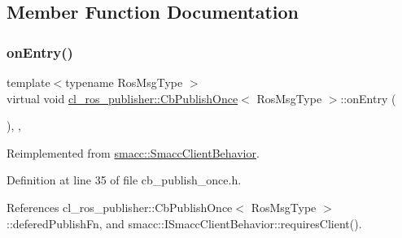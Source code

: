 \subsection{Member Function Documentation}
\mbox{\label{classcl__ros__publisher_1_1CbPublishOnce_afaed71bc2694ec1837278d5f931a76e1}} 
\subsubsection{\texorpdfstring{on\+Entry()}{onEntry()}}
{\footnotesize\ttfamily template$<$typename Ros\+Msg\+Type $>$ \\
virtual void \hyperlink{classcl__ros__publisher_1_1CbPublishOnce}{cl\+\_\+ros\+\_\+publisher\+::\+Cb\+Publish\+Once}$<$ Ros\+Msg\+Type $>$\+::on\+Entry (\begin{DoxyParamCaption}{ }\end{DoxyParamCaption})\hspace{0.3cm}{\ttfamily [inline]}, {\ttfamily [override]}, {\ttfamily [virtual]}}



Reimplemented from \hyperlink{classsmacc_1_1SmaccClientBehavior_ad5d3e1f1697c3cfe66c94cadba948493}{smacc\+::\+Smacc\+Client\+Behavior}.



Definition at line 35 of file cb\+\_\+publish\+\_\+once.\+h.



References cl\+\_\+ros\+\_\+publisher\+::\+Cb\+Publish\+Once$<$ Ros\+Msg\+Type $>$\+::defered\+Publish\+Fn, and smacc\+::\+I\+Smacc\+Client\+Behavior\+::requires\+Client().


